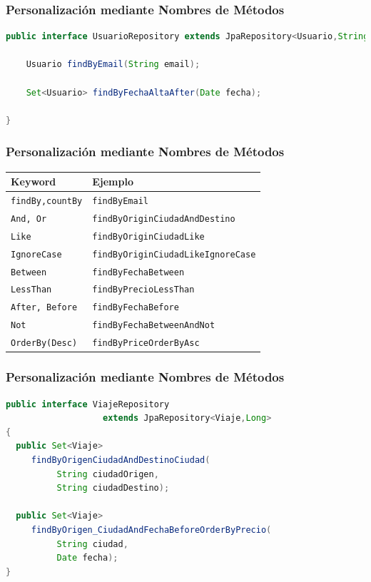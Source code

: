 \documentclass[a4paper,slidestop,xcolor=pst,blue]{beamer}
\newcommand{\ann}[1]{\color{blue}\texttt{#1}\color{black}}
\begin{document}
\begin{frame}[c,fragile]
    \frametitle{Personalización mediante Nombres de Métodos}
\begin{lstlisting}[basicstyle=\footnotesize,language=Java]
public interface UsuarioRepository extends JpaRepository<Usuario,String> {
	
	Usuario findByEmail(String email);
	
	Set<Usuario> findByFechaAltaAfter(Date fecha);

}
\end{lstlisting}
\end{frame}

\begin{frame}[c,fragile]
    \frametitle{Personalización mediante Nombres de Métodos}
    \begin{center}
    \begin{tabular}{l|l}
    Keyword              & Ejemplo                               \\\hline
    \ann{findBy,countBy} & \texttt{findByEmail}                  \\
    \ann{And, Or}        & \texttt{findByOriginCiudadAndDestino} \\
    \ann{Like}           & \texttt{findByOriginCiudadLike}       \\
    \ann{IgnoreCase}     & \texttt{findByOriginCiudadLikeIgnoreCase}   \\
    \ann{Between}        & \texttt{findByFechaBetween}           \\
    \ann{LessThan}       & \texttt{findByPrecioLessThan}         \\
    \ann{After, Before}  & \texttt{findByFechaBefore}            \\
    \ann{Not}            & \texttt{findByFechaBetweenAndNot}     \\
    \ann{OrderBy(Desc)}  & \texttt{findByPriceOrderByAsc}        \\
    \end{tabular}
    \end{center}
\end{frame}

\begin{frame}[c,fragile]
    \frametitle{Personalización mediante Nombres de Métodos}
\begin{lstlisting}[basicstyle=\footnotesize,language=Java]
public interface ViajeRepository 
                   extends JpaRepository<Viaje,Long> 
{
  public Set<Viaje> 
     findByOrigenCiudadAndDestinoCiudad(
          String ciudadOrigen, 
          String ciudadDestino);
	
  public Set<Viaje> 
     findByOrigen_CiudadAndFechaBeforeOrderByPrecio(
          String ciudad, 
          Date fecha);
}
\end{lstlisting}
\end{frame}
\end{document}
